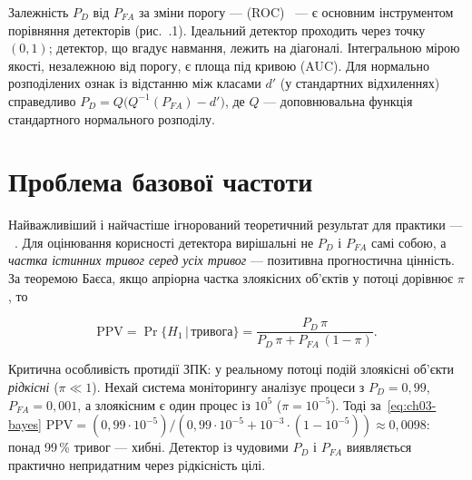 Залежність $P_D$ від $P_{FA}$ за зміни порогу ---  (ROC)~\cite{ch03:fawcett} --- є основним інструментом порівняння детекторів (рис.~\thechapter.1). Ідеальний детектор проходить через точку $(0,1)$; детектор, що вгадує навмання, лежить на діагоналі. Інтегральною мірою якості, незалежною від порогу, є площа під кривою (AUC). Для нормально розподілених ознак із відстанню між класами $d'$ (у стандартних відхиленнях) справедливо $P_D = Q\bigl(Q^{-1}(P_{FA}) - d'\bigr)$, де $Q$ --- доповнювальна функція стандартного нормального розподілу.

\begin{tikzfig}
\end{tikzfig}

\section{Проблема базової частоти}\label{sec:ch03-baserate}

Найважливіший і найчастіше ігнорований теоретичний результат для практики --- ~\cite{ch03:axelsson}. Для оцінювання корисності детектора вирішальні не $P_D$ і $P_{FA}$ самі собою, а \emph{частка істинних тривог серед усіх тривог} --- позитивна прогностична цінність. За теоремою Баєса, якщо апріорна частка злоякісних об'єктів у потоці дорівнює $\pi$, то

\begin{equation}
\mathrm{PPV} = \Pr\{H_1\,|\,\text{тривога}\} = \frac{P_D\,\pi}{P_D\,\pi + P_{FA}\,(1-\pi)}.
\label{eq:ch03-bayes}
\end{equation}

Критична особливість протидії ЗПК: у реальному потоці подій злоякісні об'єкти \emph{рідкісні} ($\pi \ll 1$). Нехай система моніторингу аналізує процеси з $P_D = 0{,}99$, $P_{FA} = 0{,}001$, а злоякісним є один процес із $10^5$ ($\pi = 10^{-5}$). Тоді за~\eqref{eq:ch03-bayes} $\mathrm{PPV} = (0{,}99\cdot10^{-5})/(0{,}99\cdot10^{-5} + 10^{-3}\cdot(1-10^{-5})) \approx 0{,}0098$: понад 99\,\% тривог --- хибні. Детектор із чудовими $P_D$ і $P_{FA}$ виявляється практично непридатним через рідкісність цілі.

